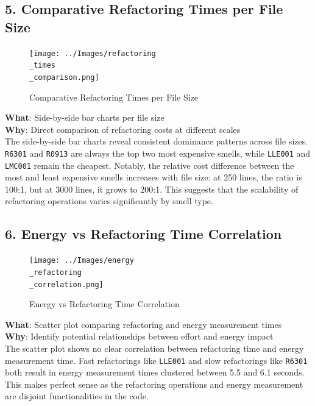 \documentclass[12pt, titlepage]{article}
\begin{document}
\subsection*{5. Comparative Refactoring Times per File Size}
\begin{figure}[H]
    \centering
    \texttt{[image: ../Images/refactoring\\\_times\\\_comparison.png]}
    \caption{Comparative Refactoring Times per File Size}
\end{figure}

\noindent \textbf{What}: Side-by-side bar charts per file size\\

\noindent \textbf{Why}: Direct comparison of refactoring costs at different scales\\

The side-by-side bar charts reveal consistent dominance patterns across file sizes. \texttt{R6301} and \texttt{R0913} are always the top two most expensive smells, while \texttt{LLE001} and \texttt{LMC001} remain the cheapest. Notably, the relative cost difference between the most and least expensive smells increases with file size: at 250 lines, the ratio is 100:1, but at 3000 lines, it grows to 200:1. This suggests that the scalability of refactoring operations varies significantly by smell type.

\subsection*{6. Energy vs Refactoring Time Correlation}

\begin{figure}[H]
    \centering
    \texttt{[image: ../Images/energy\\\_refactoring\\\_correlation.png]}
    \caption{Energy vs Refactoring Time Correlation}
\end{figure}

\noindent \textbf{What}: Scatter plot comparing refactoring and energy measurement times\\

\noindent \textbf{Why}: Identify potential relationships between effort and energy impact\\

The scatter plot shows no clear correlation between refactoring time and energy measurement time. Fast refactorings like \texttt{LLE001} and slow refactorings like \texttt{R6301} both result in energy measurement times clustered between 5.5 and 6.1 seconds. This makes perfect sense as the refactoring operations and energy measurement are disjoint functionalities in the code. 
\end{document}
